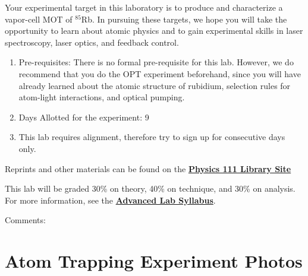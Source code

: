 \documentclass{../lab}
\begin{document}
Your experimental target in this laboratory is to produce and characterize a vapor-cell MOT of $^{85}$Rb.  In pursuing these targets, we hope you will take the opportunity to learn about atomic physics and to gain experimental skills in laser spectroscopy, laser optics, and feedback control.

\begin{enumerate}
    \item Pre-requisites: There is no formal pre-requisite for this lab. However, we do recommend that you do the OPT experiment beforehand, since you will have already learned about the atomic structure of rubidium, selection rules for atom-light interactions, and optical pumping.

    \item Days Allotted for the experiment: 9

    \item This lab requires alignment, therefore try to sign up for consecutive days only.
\end{enumerate}

Reprints and other materials can be found on the \href{http://physics111.lib.berkeley.edu/Physics111/Reprints/MOT/MOT\_index.html}{\textbf{Physics 111 Library Site}}

This lab will be graded 30\% on theory, 40\% on technique, and 30\% on analysis. For more information, see the \href{http://experimentationlab.berkeley.edu/syllabus}{\textbf{Advanced Lab Syllabus}}.

Comments: \Feedback

\section{Atom Trapping Experiment Photos}
\end{document}
